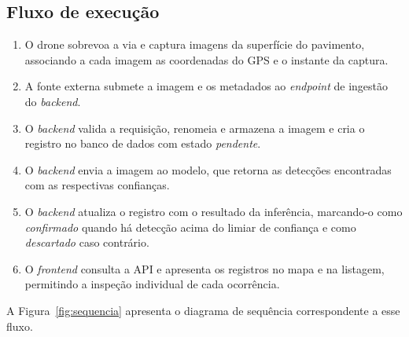 \documentclass[12pt]{article}
\begin{document}
\subsection{Fluxo de execução}
\label{sec:fluxo}

\begin{enumerate}
  \item O drone sobrevoa a via e captura imagens da superfície do
    pavimento, associando a cada imagem as coordenadas do GPS e o
    instante da captura.
  \item A fonte externa submete a imagem e os metadados ao
    \emph{endpoint} de ingestão do \emph{backend}.
  \item O \emph{backend} valida a requisição, renomeia e armazena a
    imagem e cria o registro no banco de dados com estado
    \emph{pendente}.
  \item O \emph{backend} envia a imagem ao modelo, que retorna as
    detecções encontradas com as respectivas confianças.
  \item O \emph{backend} atualiza o registro com o resultado da
    inferência, marcando-o como \emph{confirmado} quando há detecção
    acima do limiar de confiança e como \emph{descartado} caso contrário.
  \item O \emph{frontend} consulta a API e apresenta os registros no mapa
    e na listagem, permitindo a inspeção individual de cada ocorrência.
\end{enumerate}

A Figura~\ref{fig:sequencia} apresenta o diagrama de sequência
correspondente a esse fluxo.
\end{document}

